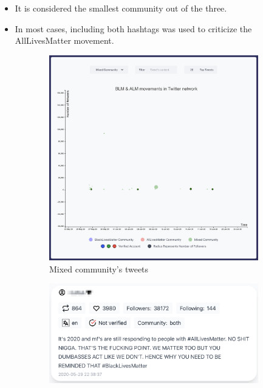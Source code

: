 \begin{itemize}
    \item It is considered the smallest community out of the three.
    \item In most cases, including both hashtags was used to criticize the AllLivesMatter movement.
    
\end{itemize}
\begin{figure}[H]

\begin{subfigure}{.5\textwidth}
  \centering
  \captionsetup{justification=centering}
  \includegraphics[width=1\linewidth]{Report-latex/tex_files/pics/example/obserm.png}  
 
  \caption{Mixed community's tweets}
  \label{fig:sub-second}
\end{subfigure}
\begin{subfigure}{.5\textwidth}
  \centering
  \captionsetup{justification=centering}
  \includegraphics[width=1\linewidth]{Report-latex/tex_files/pics/example/obserm1.png}
  

\end{subfigure}
\end{figure}
